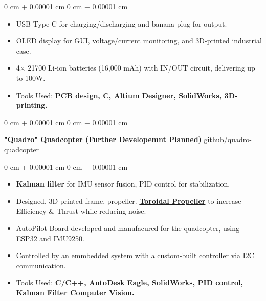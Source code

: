 \documentclass[10pt, letterpaper]{article}
\newenvironment{highlights}{
    \begin{itemize}[
        topsep=0.10 cm,
        parsep=0.10 cm,
        partopsep=0pt,
        itemsep=0pt,
        leftmargin=0 cm + 10pt
    ]
}{
    \end{itemize}
} %
\newenvironment{onecolentry}{
    \begin{adjustwidth}{
        0 cm + 0.00001 cm
    }{
        0 cm + 0.00001 cm
    }
}{
    \end{adjustwidth}
} %
\newenvironment{twocolentry}[2][]{
    \onecolentry
    \def\secondColumn{#2}
    \setcolumnwidth{\fill, 4.5 cm}
    \begin{paracol}{2}
}{
    \switchcolumn \raggedleft \secondColumn
    \end{paracol}
    \endonecolentry
} %
\begin{document}
\vspace{0.10 cm}
\begin{onecolentry}
      \begin{highlights}
            \item USB Type-C for charging/discharging and banana plug for output.
            \item OLED display for GUI, voltage/current monitoring, and 3D-printed industrial
            case.
            \item 4× 21700 Li-ion batteries (16,000 mAh) with IN/OUT circuit, delivering up to 100W.
            \item Tools Used:\textbf{ PCB design, C, Altium Designer, SolidWorks, 3D-printing.}
      \end{highlights}
\end{onecolentry}

\vspace{0.4 cm}
\begin{twocolentry}{
            \href{https://github.com/bocho0600/quadro-quadcopter}{github/quadro-quadcopter}
      }
      \textbf{"Quadro" Quadcopter (Further Developemnt Planned)}\end{twocolentry}

\vspace{0.10 cm}
\begin{onecolentry}
      \begin{highlights}
            \item \textbf{Kalman filter} for IMU sensor fusion, PID control for stabilization.
            \item Designed, 3D-printed frame, propeller.
            \textbf{\href{https://www.ll.mit.edu/sites/default/files/other/doc/2022-09/TVO_Technology_Highlight_41_Toroidal_Propeller.pdf}{Toroidal
                        Propeller}} to increase Efficiency \& Thrust while reducing noise.
            \item AutoPilot Board developed and manufacured for the quadcopter, using ESP32 and
            IMU9250.
            \item Controlled by an emmbedded system with a custom-built controller via I2C
            communication.
            \item Tools Used: \textbf{C/C++, AutoDesk Eagle, SolidWorks, PID control, Kalman
                  Filter Computer Vision.}

      \end{highlights}
\end{onecolentry}
\end{document}
